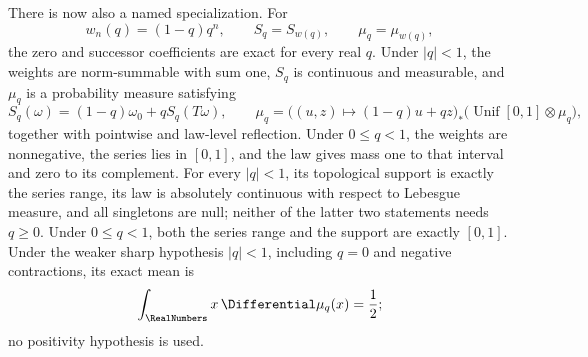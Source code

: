 \documentclass[11pt,oneside]{article}
\theoremstyle{definition}
\theoremstyle{remark}
\begin{document}
There is now also a named specialization.  For
\[
 w_n(q)=(1-q)q^n,\qquad S_q=S_{w(q)},\qquad \mu_q=\mu_{w(q)},
\]
the zero and successor coefficients are exact for every real \(q\).  Under \(|q|<1\),
the weights are norm-summable with sum one, \(S_q\) is continuous and measurable, and
\(\mu_q\) is a probability measure satisfying
\[
 S_q(\omega)=(1-q)\omega_0+qS_q(T\omega),\qquad
 \mu_q=\bigl((u,z)\mapsto(1-q)u+qz\bigr)_*
   \bigl(\operatorname{Unif}[0,1]\otimes\mu_q\bigr),
\]
together with pointwise and law-level reflection.  Under \(0\le q<1\), the weights are
nonnegative, the series lies in \([0,1]\), and the law gives mass one to that interval and
zero to its complement.  For every \(|q|<1\), its topological support is exactly the series
range, its law is absolutely continuous with respect to Lebesgue measure, and all singletons
are null; neither of the latter two statements needs \(q\ge0\).  Under \(0\le q<1\), both
the series range and the support are exactly \([0,1]\).  Under the weaker sharp hypothesis
\(|q|<1\), including \(q=0\) and negative contractions, its exact mean is
\[
 \int_{\RealNumbers}x\,\Differential\mu_q(x)=\frac12;
\]
no positivity hypothesis is used.
\end{document}
